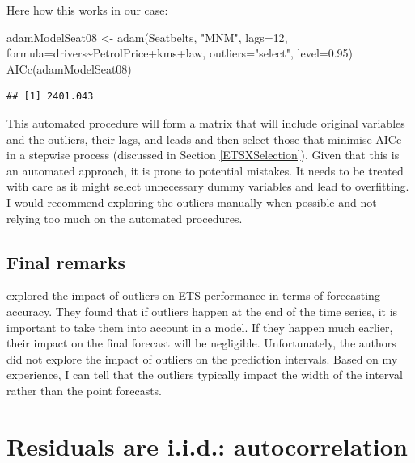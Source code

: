 \documentclass[
]{book}
\newenvironment{Shaded}{\begin{snugshade}}{\end{snugshade}}
\newcommand{\AttributeTok}[1]{\textcolor[rgb]{0.77,0.63,0.00}{#1}}
\newcommand{\DecValTok}[1]{\textcolor[rgb]{0.00,0.00,0.81}{#1}}
\newcommand{\FloatTok}[1]{\textcolor[rgb]{0.00,0.00,0.81}{#1}}
\newcommand{\FunctionTok}[1]{\textcolor[rgb]{0.00,0.00,0.00}{#1}}
\newcommand{\NormalTok}[1]{#1}
\newcommand{\OtherTok}[1]{\textcolor[rgb]{0.56,0.35,0.01}{#1}}
\newcommand{\SpecialCharTok}[1]{\textcolor[rgb]{0.00,0.00,0.00}{#1}}
\newcommand{\StringTok}[1]{\textcolor[rgb]{0.31,0.60,0.02}{#1}}
\theoremstyle{definition}
\theoremstyle{definition}
\theoremstyle{definition}
\theoremstyle{definition}
\theoremstyle{remark}
\begin{document}
Here how this works in our case:

\begin{Shaded}
\begin{Highlighting}[]
\NormalTok{adamModelSeat08 }\OtherTok{\textless{}{-}} \FunctionTok{adam}\NormalTok{(Seatbelts, }\StringTok{"MNM"}\NormalTok{, }\AttributeTok{lags=}\DecValTok{12}\NormalTok{,}
                        \AttributeTok{formula=}\NormalTok{drivers}\SpecialCharTok{\textasciitilde{}}\NormalTok{PetrolPrice}\SpecialCharTok{+}\NormalTok{kms}\SpecialCharTok{+}\NormalTok{law,}
                        \AttributeTok{outliers=}\StringTok{"select"}\NormalTok{, }\AttributeTok{level=}\FloatTok{0.95}\NormalTok{)}
\FunctionTok{AICc}\NormalTok{(adamModelSeat08)}
\end{Highlighting}
\end{Shaded}

\begin{verbatim}
## [1] 2401.043
\end{verbatim}

This automated procedure will form a matrix that will include original variables and the outliers, their lags, and leads and then select those that minimise AICc in a stepwise process (discussed in Section \ref{ETSXSelection}). Given that this is an automated approach, it is prone to potential mistakes. It needs to be treated with care as it might select unnecessary dummy variables and lead to overfitting. I would recommend exploring the outliers manually when possible and not relying too much on the automated procedures.

\hypertarget{final-remarks}{%
\subsection{Final remarks}\label{final-remarks}}

\citet{Koehler2012} explored the impact of outliers on ETS performance in terms of forecasting accuracy. They found that if outliers happen at the end of the time series, it is important to take them into account in a model. If they happen much earlier, their impact on the final forecast will be negligible. Unfortunately, the authors did not explore the impact of outliers on the prediction intervals. Based on my experience, I can tell that the outliers typically impact the width of the interval rather than the point forecasts.

\hypertarget{diagnosticsResidualsIIDAuto}{%
\section{Residuals are i.i.d.: autocorrelation}\label{diagnosticsResidualsIIDAuto}}
\end{document}
